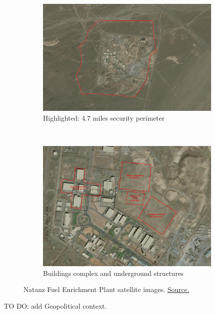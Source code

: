 \documentclass[12pt]{article}
\begin{document}
\begin{figure}[ht!]
    \centering
    \begin{subfigure}[t]{0.5\textwidth}
        \centering
        \includegraphics[height=0.65\textwidth]{natanz1.jpg}
        \caption{Highlighted: 4.7 miles security perimeter}
    \end{subfigure}%
    ~ 
    \begin{subfigure}[t]{0.5\textwidth}
        \centering
        \includegraphics[height=0.65\textwidth]{natanz2.jpg}
        \caption{Buildings complex and underground structures}
    \end{subfigure}
    \caption{Natanz Fuel Enrichment Plant satellite images. \href{https://publicintelligence.net/iran-nuclear-site-natanz-uranium-enrichment-site/}{Source.}}
\end{figure}

    TO DO: add Geopolitical context.
\end{document}
